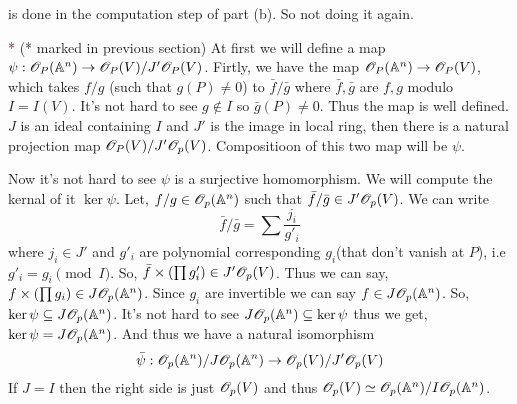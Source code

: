 \documentclass[12pt]{article}
\begin{document}
\noindent \textcolor{maroon}{} is done in the computation step of  part (b). So not doing it again.

\vspace*{0.2cm}

\noindent \textcolor{maroon}{*} (* marked in previous section) At first we will define a map $\psi : \mathscr{O}_P(\mathbb{A}^n) \to \mathscr{O}_P(V)/J'\mathscr{O}_P(V)$. Firtly, we have the map $\mathscr{O}_P(\mathbb{A}^n) \to \mathscr{O}_P(V)$, which takes $f/g$ (such that $g(P)\neq 0$) to $\bar{f}/\bar{g}$ where $\bar{f},\bar{g}$ are $f,g$ modulo $I = I(V)$. It's not hard to see $g \notin I$ so $\bar{g}(P)\neq0$. Thus the map is well defined. $J$ is an ideal containing $I$ and $J'$ is the image in local ring, then there is a natural projection map $\mathscr{O}_P(V)/J'\mathscr{O}_p(V)$. Compositioon of this two map will be $\psi$.

\vspace*{0.2cm}

Now it's not hard to see $\psi$ is a surjective homomorphism. We will compute the kernal of it $\ker \psi$. Let, $f/g \in \mathscr{O}_p(\mathbb{A}^n)$ such that $\bar{f}/\bar{g} \in J'\mathscr{O}_p(V)$. We can write $$\bar{f}/\bar{g} = \sum \frac{j_i}{g'_i}$$ where $j_i \in J'$ and $g'_i$ are polynomial corresponding $g_i$(that don't vanish at $P$), i.e $g'_i =g_i \pmod{I}$. So, $\bar{f} \times \qty(\prod g'_i) \in J'\mathscr{O}_p(V)$. Thus we can say, $f \times \qty(\prod g_i) \in J\mathscr{O}_p(\mathbb{A}^n)$. Since $g_i$ are invertible we can say $f \in J\mathscr{O}_p(\mathbb{A}^n)$. So, $\ker \psi \subseteq J\mathscr{O}_p(\mathbb{A}^n)$. It's not hard to see $J\mathscr{O}_p(\mathbb{A}^n) \subseteq \ker \psi$ thus we get, $\ker \psi = J\mathscr{O}_p(\mathbb{A}^n)$. And thus we have a natural isomorphism $$\bar{\psi}: \mathscr{O}_p(\mathbb{A}^n)/J\mathscr{O}_p(\mathbb{A}^n) \to \mathscr{O}_p(V)/J'\mathscr{O}_p(V)$$  If $J=I$ then the right side is just $\mathscr{O}_p(V)$ and thus $\mathscr{O}_p(V)\simeq \mathscr{O}_p(\mathbb{A}^n)/I\mathscr{O}_p(\mathbb{A}^n)$.
\end{document}
